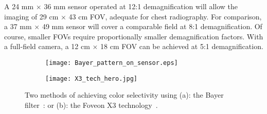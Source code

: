 A 24 mm $\times$ 36 mm sensor operated at 12:1 demagnification will allow the imaging of 29 cm $\times$ 43 cm FOV, adequate for chest radiography. For comparison, a 37 mm $\times$ 49 mm sensor will cover a comparable field at 8:1 demagnification. Of course, smaller FOVs require proportionally smaller demagnification factors.  With a full-field camera, a 12 cm $\times$ 18 cm FOV can be achieved at 5:1 demagnification.

\begin{figure}[h]
	\begin{subfigure}[b]{0.4\linewidth}
		\centering
		\texttt{[image: Bayer\_pattern\_on\_sensor.eps]}
		\caption{}
		\label{fig:bayer_pattern_on_sensor}
	\end{subfigure}
	\hspace{0.5cm}
	\begin{subfigure}[b]{0.4\linewidth}
		\centering
		\texttt{[image: X3\_tech\_hero.jpg]}
		\caption{}
		\label{fig:foveon_sensor}
	\end{subfigure}
\caption{Two methods of achieving color selectivity using (a): the Bayer filter~\citep{wikibayer}: or (b): the Foveon X3 technology~\citep{foveon}.}
\label{fig:color_selectivity}	
\end{figure}

